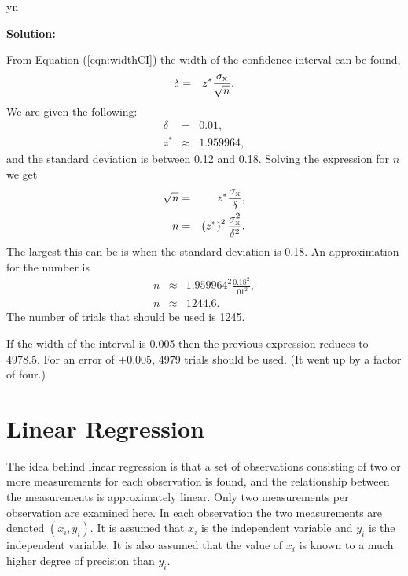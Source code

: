 \documentclass[12pt]{article}
\def\solutions{y}
\def\solutions{n}
\newcommand{\lp}{\left(}
\newcommand{\rp}{\right)}
\begin{document}
\if y\solutions

\textbf{Solution:}

From Equation (\ref{eqn:widthCI}) the width of the confidence interval
can be found,
\begin{eqnarray*}
  \delta & = & z^* \frac{\sigma_{\rm x}}{\sqrt{n}}.
\end{eqnarray*}
We are given the following:
\begin{eqnarray*}
  \delta & = & 0.01, \\
  z^* & \approx & 1.959964,
\end{eqnarray*}
and the standard deviation is between 0.12 and 0.18. Solving the expression
for $n$ we get
\begin{eqnarray*}
  \sqrt{n} & = & z^* \frac{\sigma_{\rm x}}{\delta}, \\
  n & = & \lp z^* \rp^2 \frac{\sigma^2_{\rm x}}{\delta^2}.
\end{eqnarray*}
The largest this can be is when the standard deviation is 0.18. An
approximation for the number is
\begin{eqnarray*}
  n & \approx &  1.959964^2 \frac{0.18^2}{.01^2}, \\
  n & \approx & 1244.6.
\end{eqnarray*}
The number of trials that should be used is 1245.

If the width of the interval is 0.005 then the previous expression
reduces to 4978.5. For an error of $\pm 0.005$, 4979 trials should be
used. (It went up by a factor of four.)


\fi



\section{Linear Regression}

The idea behind linear regression is that a set of observations
consisting of two or more measurements for each observation is found,
and the relationship between the measurements is approximately linear.
Only two measurements per observation are examined here. In each
observation the two measurements are denoted $(x_i,y_i)$. It is
assumed that $x_i$ is the independent variable and $y_i$ is the
independent variable. It is also assumed that the value of $x_i$ is
known to a much higher degree of precision than $y_i$.
\end{document}
